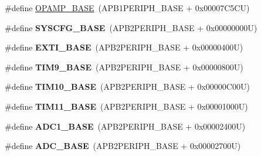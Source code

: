 \begin{DoxyCompactItemize}
\item 
\#define \hyperlink{group___peripheral__memory__map_ga6e9722d15c7ed794f0eca9682f64c03c}{O\-P\-A\-M\-P\-\_\-\-B\-A\-S\-E}~(A\-P\-B1\-P\-E\-R\-I\-P\-H\-\_\-\-B\-A\-S\-E + 0x00007\-C5\-C\-U)
\item 
\hypertarget{group___peripheral__memory__map_ga62246020bf3b34b6a4d8d0e84ec79d3d}{\#define {\bfseries S\-Y\-S\-C\-F\-G\-\_\-\-B\-A\-S\-E}~(A\-P\-B2\-P\-E\-R\-I\-P\-H\-\_\-\-B\-A\-S\-E + 0x00000000\-U)}\label{group___peripheral__memory__map_ga62246020bf3b34b6a4d8d0e84ec79d3d}

\item 
\hypertarget{group___peripheral__memory__map_ga87371508b3bcdcd98cd1ec629be29061}{\#define {\bfseries E\-X\-T\-I\-\_\-\-B\-A\-S\-E}~(A\-P\-B2\-P\-E\-R\-I\-P\-H\-\_\-\-B\-A\-S\-E + 0x00000400\-U)}\label{group___peripheral__memory__map_ga87371508b3bcdcd98cd1ec629be29061}

\item 
\hypertarget{group___peripheral__memory__map_ga92ae902be7902560939223dd765ece08}{\#define {\bfseries T\-I\-M9\-\_\-\-B\-A\-S\-E}~(A\-P\-B2\-P\-E\-R\-I\-P\-H\-\_\-\-B\-A\-S\-E + 0x00000800\-U)}\label{group___peripheral__memory__map_ga92ae902be7902560939223dd765ece08}

\item 
\hypertarget{group___peripheral__memory__map_ga3eff32f3801db31fb4b61d5618cad54a}{\#define {\bfseries T\-I\-M10\-\_\-\-B\-A\-S\-E}~(A\-P\-B2\-P\-E\-R\-I\-P\-H\-\_\-\-B\-A\-S\-E + 0x00000\-C00\-U)}\label{group___peripheral__memory__map_ga3eff32f3801db31fb4b61d5618cad54a}

\item 
\hypertarget{group___peripheral__memory__map_ga3a4a06bb84c703084f0509e105ffaf1d}{\#define {\bfseries T\-I\-M11\-\_\-\-B\-A\-S\-E}~(A\-P\-B2\-P\-E\-R\-I\-P\-H\-\_\-\-B\-A\-S\-E + 0x00001000\-U)}\label{group___peripheral__memory__map_ga3a4a06bb84c703084f0509e105ffaf1d}

\item 
\hypertarget{group___peripheral__memory__map_ga695c9a2f892363a1c942405c8d351b91}{\#define {\bfseries A\-D\-C1\-\_\-\-B\-A\-S\-E}~(A\-P\-B2\-P\-E\-R\-I\-P\-H\-\_\-\-B\-A\-S\-E + 0x00002400\-U)}\label{group___peripheral__memory__map_ga695c9a2f892363a1c942405c8d351b91}

\item 
\hypertarget{group___peripheral__memory__map_gad06cb9e5985bd216a376f26f22303cd6}{\#define {\bfseries A\-D\-C\-\_\-\-B\-A\-S\-E}~(A\-P\-B2\-P\-E\-R\-I\-P\-H\-\_\-\-B\-A\-S\-E + 0x00002700\-U)}\label{group___peripheral__memory__map_gad06cb9e5985bd216a376f26f22303cd6}


\end{DoxyCompactItemize}
